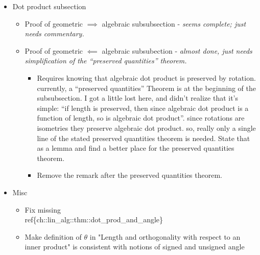 \begin{itemize}
\begin{itemize}
		\item The end of this subsection has an unfinished proof that $\sproj(\vv \rightarrow \ww) = \sproj(\RR_t(\vv) \rightarrow \RR_t(\ww))$. Finish that! \textit{This can probably go in ``Rotations in $\R^2$''.}
		\begin{itemize}
			\item This result might require a proof of this theorem, copied from the earlier ``Projections in $\R^2$'' to-do: for every $\vv \in \R^2$ there exists $\vv_\perp \in \R^2$ that is perpendicular to $\vv$.
		\end{itemize}
	\end{itemize}
	\item Dot product subsection
	\begin{itemize}
		\item Proof of geometric $\implies$ algebraic subsubsection - \textit{seems complete; just needs commentary.}
		\item Proof of geometric $\impliedby$ algebraic subsubection - \textit{almost done, just needs simplification of the ``preserved quantities'' theorem.}
		\begin{itemize}
			\item Requires knowing that algebraic dot product is preserved by rotation. currently, a ``preserved quantities'' Theorem is at the beginning of the subsubsection. I got a little lost here, and didn't realize that it's simple: ``if length is preserved, then since algebraic dot product is a function of length, so is algebraic dot product''. since rotations are isometries they preserve algebraic dot product. so, really only a single line of the stated preserved quantities theorem is needed. State that as a lemma and find a better place for the preserved quantities theorem.
			\item Remove the remark after the preserved quantities theorem.
		\end{itemize}
	\end{itemize}
	\item Misc
	\begin{itemize}
		\item Fix missing \\ref\{ch::lin\_alg::thm::dot\_prod\_and\_angle\}
		\item Make definition of $\theta$ in "Length and orthogonality with respect to an inner product" is consistent with notions of signed and unsigned angle
	\end{itemize}
\end{itemize}

